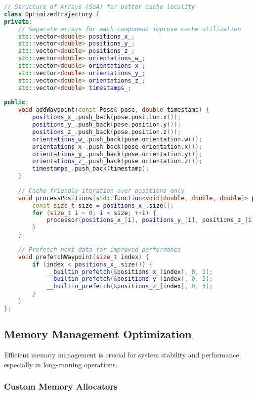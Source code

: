 \begin{lstlisting}[language=C++, caption=Cache-Optimized Data Structures]
// Structure of Arrays (SoA) for better cache locality
class OptimizedTrajectory {
private:
    // Separate arrays for each component improve cache utilization
    std::vector<double> positions_x_;
    std::vector<double> positions_y_;
    std::vector<double> positions_z_;
    std::vector<double> orientations_w_;
    std::vector<double> orientations_x_;
    std::vector<double> orientations_y_;
    std::vector<double> orientations_z_;
    std::vector<double> timestamps_;
    
public:
    void addWaypoint(const Pose& pose, double timestamp) {
        positions_x_.push_back(pose.position.x());
        positions_y_.push_back(pose.position.y());
        positions_z_.push_back(pose.position.z());
        orientations_w_.push_back(pose.orientation.w());
        orientations_x_.push_back(pose.orientation.x());
        orientations_y_.push_back(pose.orientation.y());
        orientations_z_.push_back(pose.orientation.z());
        timestamps_.push_back(timestamp);
    }
    
    // Cache-friendly iteration over positions only
    void processPositions(std::function<void(double, double, double)> processor) {
        const size_t size = positions_x_.size();
        for (size_t i = 0; i < size; ++i) {
            processor(positions_x_[i], positions_y_[i], positions_z_[i]);
        }
    }
    
    // Prefetch next data for improved performance
    void prefetchWaypoint(size_t index) {
        if (index < positions_x_.size()) {
            __builtin_prefetch(&positions_x_[index], 0, 3);
            __builtin_prefetch(&positions_y_[index], 0, 3);
            __builtin_prefetch(&positions_z_[index], 0, 3);
        }
    }
};
\end{lstlisting}

\subsection{Memory Management Optimization}
\label{subsec:memory_management}

Efficient memory management is crucial for system stability and performance, especially in long-running operations.

\subsubsection{Custom Memory Allocators}

